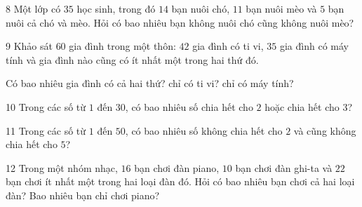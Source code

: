 \gap
\begin{probbox}{8}{\relax}
Một lớp có $35$ học sinh, trong đó $14$ bạn nuôi chó, $11$ bạn nuôi mèo và $5$ bạn nuôi cả chó và mèo. Hỏi có bao nhiêu bạn không nuôi chó cũng không nuôi mèo?
\end{probbox}
\gap
\begin{probbox}{9}{\relax}
Khảo sát $60$ gia đình trong một thôn: $42$ gia đình có ti vi, $35$ gia đình có máy tính và gia đình nào cũng có ít nhất một trong hai thứ đó.\par
{} Có bao nhiêu gia đình có cả hai thứ? \quad {} chỉ có ti vi? \quad {} chỉ có máy tính?
\end{probbox}
\gap
\begin{probbox}{10}{\relax}
Trong các số từ $1$ đến $30$, có bao nhiêu số chia hết cho $2$ hoặc chia hết cho $3$?
\end{probbox}
\gap
\begin{probbox}{11}{\relax}
Trong các số từ $1$ đến $50$, có bao nhiêu số không chia hết cho $2$ và cũng không chia hết cho $5$?
\end{probbox}
\gap
\begin{probbox}{12}{\relax}
Trong một nhóm nhạc, $16$ bạn chơi đàn piano, $10$ bạn chơi đàn ghi-ta và $22$ bạn chơi ít nhất một trong hai loại đàn đó. Hỏi có bao nhiêu bạn chơi cả hai loại đàn? Bao nhiêu bạn chỉ chơi piano?
\end{probbox}
